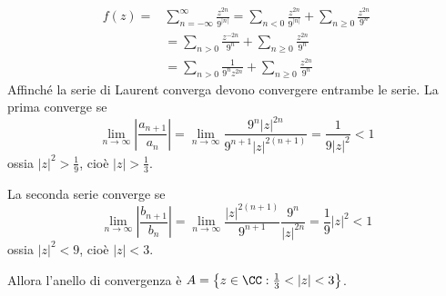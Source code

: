 \begin{align*}
f(z) = & \sum\limits^{\infty}_{n = -\infty}\frac{z^{2n}}{9^{\left| n\right|}} = \sum_{n < 0}\frac{z^{2n}}{9^{\left| n\right|}} + \sum_{n \geq 0}\frac{z^{2n}}{9^{n}}\\
 & = \sum_{n > 0}\frac{z^{- 2n}}{9^{n}} + \sum_{n \geq 0}\frac{z^{2n}}{9^{n}}\\
 & = \sum_{n > 0}\frac{1}{9^{n} z^{2n}} + \sum_{n \geq 0}\frac{z^{2n}}{9^{n}}
\end{align*}
Affinché la serie di Laurent converga devono convergere entrambe le serie. La prima converge se
\begin{equation*}
\lim\limits_{n\rightarrow \infty}\left| \frac{a_{n + 1}}{a_{n}}\right| = \lim\limits_{n\rightarrow \infty}\frac{9^{n}\left| z\right|^{2n}}{9^{n + 1}\left| z\right|^{2\left(n + 1\right)}} = \frac{1}{9\left| z\right|^{2}} < 1
\end{equation*}
ossia $\left| z\right|^{2} > \frac{1}{9}$, cioè $\left| z\right| > \frac{1}{3}$.

La seconda serie converge se
\begin{equation*}
\lim\limits_{n\rightarrow \infty}\left| \frac{b_{n + 1}}{b_{n}}\right| = \lim\limits_{n\rightarrow \infty}\frac{\left| z\right|^{2\left(n + 1\right)}}{9^{n + 1}}\frac{9^{n}}{\left| z\right|^{2n}} = \frac{1}{9}\left| z\right|^{2} < 1
\end{equation*}
ossia $\left| z\right|^{2} < 9$, cioè $\left| z\right| < 3$.

Allora l'anello di convergenza è $A = \left\{z\in \CC :\frac{1}{3} < \left| z\right| < 3\right\}$.

\Soluzione

